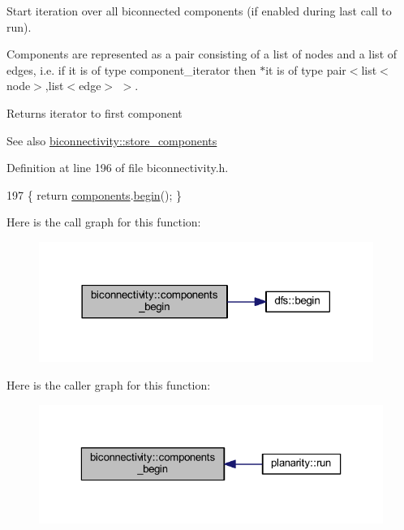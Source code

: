 Start iteration over all biconnected components (if enabled during last call to run). 

Components are represented as a pair consisting of a list of nodes and a list of edges, i.\+e. if it is of type component\+\_\+iterator then $\ast$it is of type pair$<$list$<$node$>$,list$<$edge$>$ $>$.

\begin{DoxyReturn}{Returns}
iterator to first component 
\end{DoxyReturn}
\begin{DoxySeeAlso}{See also}
\mbox{\hyperlink{classbiconnectivity_a1234e7a70f50fd60c855529fe6fa4acb}{biconnectivity\+::store\+\_\+components}} 
\end{DoxySeeAlso}


Definition at line 196 of file biconnectivity.\+h.


\begin{DoxyCode}
197     \{ \textcolor{keywordflow}{return} \mbox{\hyperlink{classcomponents}{components}}.\mbox{\hyperlink{classdfs_ab06650dd8cbd5e76b0c73b71458ec5ec}{begin}}(); \}
\end{DoxyCode}
Here is the call graph for this function\+:\nopagebreak
\begin{figure}[H]
\begin{center}
\leavevmode
\includegraphics[width=309pt]{classbiconnectivity_ac0b7253533edc3f1412f771cb35bf04a_cgraph}
\end{center}
\end{figure}
Here is the caller graph for this function\+:\nopagebreak
\begin{figure}[H]
\begin{center}
\leavevmode
\includegraphics[width=323pt]{classbiconnectivity_ac0b7253533edc3f1412f771cb35bf04a_icgraph}
\end{center}
\end{figure}
\mbox{\label{classbiconnectivity_a0bd1c70975e664174e591efd64f8dc71}} 

